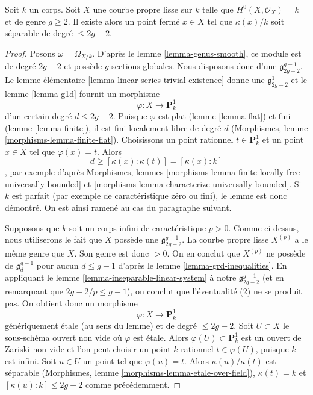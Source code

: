 \begin{lemma}
\label{lemma-point-over-separable-extension}
Soit $k$ un corps. Soit $X$ une courbe propre lisse sur $k$ telle que $H^0(X, \mathcal{O}_X) = k$ et de genre $g \geq 2$. Il existe alors un point fermé $x \in X$ tel que $\kappa(x)/k$ soit séparable de degré $\leq 2g - 2$.
\end{lemma}

\begin{proof}
Posons $\omega = \Omega_{X/k}$. D'après le lemme \ref{lemma-genus-smooth}, ce module est de degré $2g - 2$ et possède $g$ sections globales. Nous disposons donc d'une $\mathfrak g^{g - 1}_{2g - 2}$. Le lemme élémentaire \ref{lemma-linear-series-trivial-existence} donne une $\mathfrak g^1_{2g - 2}$ et le lemme \ref{lemma-g1d} fournit un morphisme $$
\varphi : X \longrightarrow \mathbf{P}^1_k
$$ d'un certain degré $d \leq 2g - 2$. Puisque $\varphi$ est plat (lemme \ref{lemma-flat}) et fini (lemme \ref{lemma-finite}), il est fini localement libre de degré $d$ (Morphismes, lemme \ref{morphisms-lemma-finite-flat}). Choisissons un point rationnel $t \in \mathbf{P}^1_k$ et un point $x \in X$ tel que $\varphi(x) = t$. Alors $$
d \geq [\kappa(x) : \kappa(t)] = [\kappa(x) : k]
$$, par exemple d'après Morphismes, lemmes \ref{morphisms-lemma-finite-locally-free-universally-bounded} et \ref{morphisms-lemma-characterize-universally-bounded}. Si $k$ est parfait (par exemple de caractéristique zéro ou fini), le lemme est donc démontré. On est ainsi ramené au cas du paragraphe suivant.

\medskip\noindent
Supposons que $k$ soit un corps infini de caractéristique $p > 0$. Comme ci-dessus, nous utiliserons le fait que $X$ possède une $\mathfrak g^{g - 1}_{2g - 2}$. La courbe propre lisse $X^{(p)}$ a le même genre que $X$. Son genre est donc $> 0$. On en conclut que $X^{(p)}$ ne possède de $\mathfrak g^{g - 1}_d$ pour aucun $d \leq g - 1$ d'après le lemme \ref{lemma-grd-inequalities}. En appliquant le lemme \ref{lemma-inseparable-linear-system} à notre $\mathfrak g^{g - 1}_{2g - 2}$ (et en remarquant que $2g - 2/p \leq g - 1$), on conclut que l'éventualité (2) ne se produit pas. On obtient donc un morphisme $$
\varphi : X \longrightarrow \mathbf{P}^1_k
$$ génériquement \'etale (au sens du lemme) et de degré $\leq 2g - 2$. Soit $U \subset X$ le sous-schéma ouvert non vide où $\varphi$ est \'etale. Alors $\varphi(U) \subset \mathbf{P}^1_k$ est un ouvert de Zariski non vide et l'on peut choisir un point $k$-rationnel $t \in \varphi(U)$, puisque $k$ est infini. Soit $u \in U$ un point tel que $\varphi(u) = t$. Alors $\kappa(u)/\kappa(t)$ est séparable (Morphismes, lemme \ref{morphisms-lemma-etale-over-field}), $\kappa(t) = k$ et $[\kappa(u) : k] \leq 2g - 2$ comme précédemment.
\end{proof}

